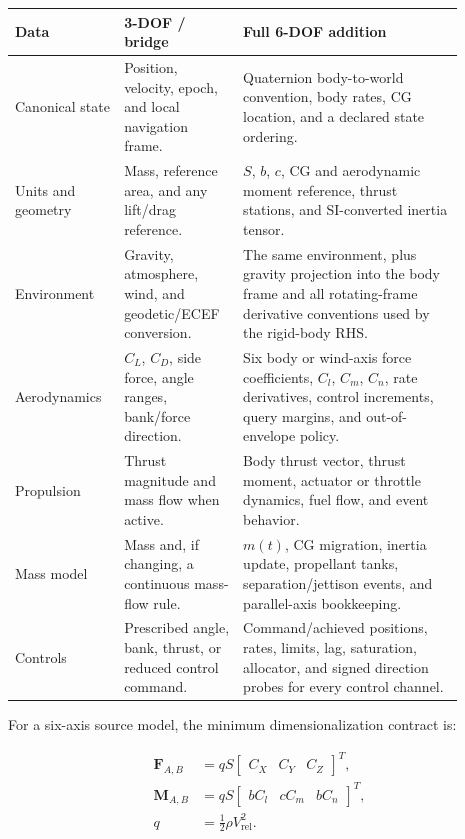 \documentclass[11pt]{article}
\begin{document}
\begin{longtable}{p{0.21\linewidth}p{0.23\linewidth}p{0.45\linewidth}}
\toprule
\textbf{Data} & \textbf{3-DOF / bridge} & \textbf{Full 6-DOF addition}\\
\midrule
\endhead
Canonical state & Position, velocity, epoch, and local navigation frame. &
  Quaternion body-to-world convention, body rates, CG location, and a declared
  state ordering.\\
Units and geometry & Mass, reference area, and any lift/drag reference. &
  $S$, $b$, $c$, CG and aerodynamic moment reference, thrust stations, and
  SI-converted inertia tensor.\\
Environment & Gravity, atmosphere, wind, and geodetic/ECEF conversion. &
  The same environment, plus gravity projection into the body frame and all
  rotating-frame derivative conventions used by the rigid-body RHS.\\
Aerodynamics & $C_L$, $C_D$, side force, angle ranges, bank/force direction. &
  Six body or wind-axis force coefficients, $C_l$, $C_m$, $C_n$, rate
  derivatives, control increments, query margins, and out-of-envelope policy.\\
Propulsion & Thrust magnitude and mass flow when active. &
  Body thrust vector, thrust moment, actuator or throttle dynamics, fuel flow,
  and event behavior.\\
Mass model & Mass and, if changing, a continuous mass-flow rule. &
  $m(t)$, CG migration, inertia update, propellant tanks, separation/jettison
  events, and parallel-axis bookkeeping.\\
Controls & Prescribed angle, bank, thrust, or reduced control command. &
  Command/achieved positions, rates, limits, lag, saturation, allocator, and
  signed direction probes for every control channel.\\
\bottomrule
\end{longtable}

For a six-axis source model, the minimum dimensionalization contract is:

\begin{align}
  \boldsymbol F_{A,B} &= q S\begin{bmatrix}C_X&C_Y&C_Z\end{bmatrix}^{T},\\
  \boldsymbol M_{A,B} &= q S\begin{bmatrix}b C_l&c C_m&b C_n\end{bmatrix}^{T},\\
  q &= \tfrac{1}{2}\rho V_{\mathrm{rel}}^2.
\end{align}
\end{document}
